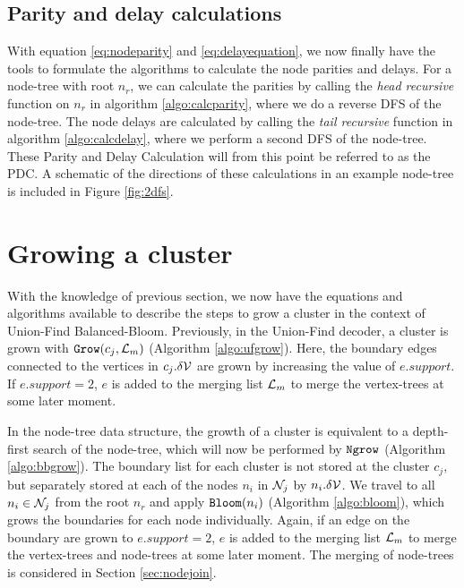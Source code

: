 
 
\subsection{Parity and delay calculations}\label{sec:pdccalc}

With equation \eqref{eq:nodeparity} and \eqref{eq:delayequation}, we now finally have the tools to formulate the algorithms to calculate the node parities and delays. For a node-tree with root $n_r$, we can calculate the parities by calling the \emph{head recursive} function  on $n_r$ in algorithm \ref{algo:calcparity}, where we do a reverse DFS of the node-tree. The node delays are calculated by calling the \emph{tail recursive} function  in algorithm \ref{algo:calcdelay}, where we perform a second DFS of the node-tree. These Parity and Delay Calculation will from this point be referred to as the PDC. A schematic of the directions of these calculations in an example node-tree is included in Figure \ref{fig:2dfs}.





\section{Growing a cluster}\label{sec:growingcluster}
With the knowledge of previous section, we now have the equations and algorithms available to describe the steps to grow a cluster in the context of Union-Find Balanced-Bloom. Previously, in the Union-Find decoder, a cluster is grown with $\texttt{Grow}(c_j, \mathcal{L}_m)$ (Algorithm \ref{algo:ufgrow}). Here, the boundary edges connected to the vertices in $c_j.\delta\mathcal{V}$ are grown by increasing the value of $e.support$. If $e.support = 2$, $e$ is added to the merging list $\mathcal{L}_m$ to merge the vertex-trees at some later moment. 

In the node-tree data structure, the growth of a cluster is equivalent to a depth-first search of the node-tree, which will now be performed by $\texttt{Ngrow}$ (Algorithm \ref{algo:bbgrow}). The boundary list for each cluster is not stored at the cluster $c_j$, but separately stored at each of the nodes $n_i$ in $\mathcal{N}_j$ by $n_i.\delta\mathcal{V}$. We travel to all $n_i \in \mathcal{N}_j$ from the root $n_r$ and apply $\texttt{Bloom}(n_i)$ (Algorithm \ref{algo:bloom}), which grows the boundaries for each node individually. Again, if an edge on the boundary are grown to $e.support = 2$, $e$ is added to the merging list $\mathcal{L}_m$ to merge the vertex-trees and node-trees at some later moment. The merging of node-trees is considered in Section \ref{sec:nodejoin}. 

